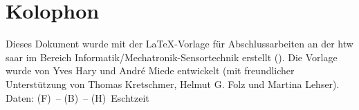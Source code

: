 \pagestyle{empty}

\hfill

\vfill


\section*{Kolophon}
Dieses Dokument wurde mit der \LaTeX-Vorlage für Abschlussarbeiten an der htw saar im Bereich Informatik/Mechatronik-Sensortechnik erstellt (\currentVersion). Die Vorlage wurde von Yves Hary und Andr\'e Miede entwickelt (mit freundlicher Unterstützung von Thomas Kretschmer, Helmut G. Folz und Martina Lehser). Daten: (F)\makeatletter\f@size\makeatother\ -- (B)\the\textwidth\ -- (H)\the\textheight\  Eschtzeit 


